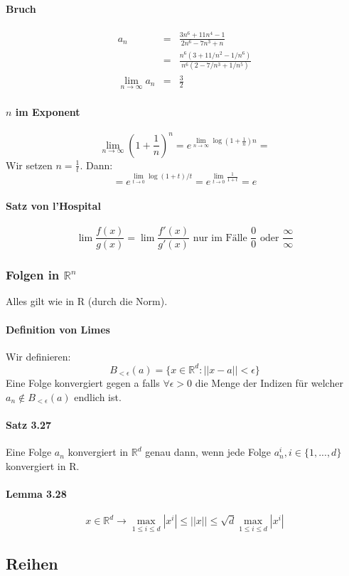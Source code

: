 \documentclass[a4paper, 9pt, DIV=24]{scrartcl}
\newcommand{\R}{\mathbb{R}}
\begin{document}
\paragraph{Bruch}
\begin{eqnarray*}
a_n &=& \frac{3n^6+11n^4-1}{2n^6-7n^3+n} \\
&=& \frac{n^6(3+11/n^2-1/n^6)}{n^6(2-7/n^3+1/n^5)} \\
\lim_{n\rightarrow \infty} a_n &=& \frac{3}{2}
\end{eqnarray*}
\paragraph{$n$ im Exponent}
$$\lim_{n\rightarrow \infty} \left(1+\frac{1}{n}\right)^n=e^{\lim_{n\rightarrow \infty} \log(1+\frac{1}{n})n} = $$
Wir setzen $n=\frac{1}{t}$. Dann:
$$=e^{\lim_{t\rightarrow 0} \log(1+t)/t}=e^{\lim_{t\rightarrow 0} \frac{1}{1+t}}=e$$
\paragraph{Satz von l'Hospital}
$$ \lim \frac{f(x)}{g(x)}=\lim \frac{f'(x)}{g'(x)} \mbox{ nur im Fälle } \frac{0}{0} \mbox{ oder } \frac{\infty}{\infty}$$

\subsubsection{Folgen in $\R^n$}
Alles gilt wie in R (durch die Norm). 
\paragraph{Definition von Limes}
Wir definieren:
$$B_{<\epsilon}(a)=\{ x \in \R^d : ||x-a||<\epsilon \}$$
Eine Folge konvergiert gegen a falls $\forall \epsilon >0$ die Menge der Indizen für welcher $a_n \not \in B_{<\epsilon}(a)$ endlich ist.
\paragraph{Satz 3.27}
Eine Folge $a_n$ konvergiert in $\R^d$ genau dann, wenn jede Folge $a_n^i, i \in \{1,...,d\}$ konvergiert in R.
\paragraph{Lemma 3.28}
$$x \in \R^d \rightarrow \max_{1\leq i \leq d} |x^i| \leq ||x|| \leq \sqrt{d} \max_{1\leq i\leq d} |x^i|$$
\subsection{Reihen}
\end{document}
